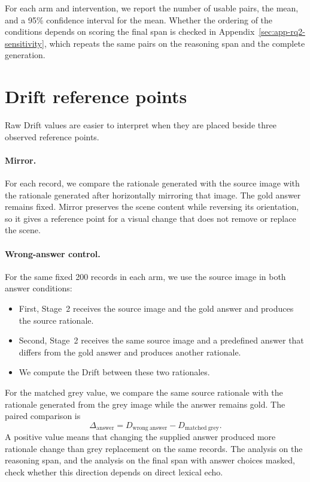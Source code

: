 For each arm and intervention, we report the number of usable pairs, the mean,
and a 95\% confidence interval for the mean. Whether the ordering of the
conditions depends on scoring the final span is checked in
Appendix~\ref{sec:app-rq2-sensitivity}, which repeats the same pairs on the
reasoning span and the complete generation.

\section{Drift reference points}
\label{sec:framework-anchors}

Raw Drift values are easier to interpret when they are placed beside three
observed reference points.

\paragraph{Mirror.}
For each record, we compare the rationale generated with the source image with
the rationale generated after horizontally mirroring that image. The gold answer
remains fixed. Mirror preserves the scene content while reversing its
orientation, so it gives a reference point for a visual change that does not
remove or replace the scene.

\paragraph{Wrong-answer control.}
For the same fixed 200 records in each arm, we use the source image in both
answer conditions:

\begin{itemize}
  \item First, Stage~2 receives the source image and the gold answer and
        produces the source rationale.
  \item Second, Stage~2 receives the same source image and a predefined answer
        that differs from the gold answer and produces another rationale.
  \item We compute the Drift between these two rationales.
\end{itemize}

For the matched grey value, we compare the same source rationale with the
rationale generated from the grey image while the answer remains gold. The
paired comparison is
\[
  \Delta_{\mathrm{answer}}
  =D_{\mathrm{wrong\ answer}}-D_{\mathrm{matched\ grey}}.
\]
A positive value means that changing the supplied answer produced more rationale
change than grey replacement on the same records. The analysis on the reasoning
span, and the analysis on the final span with answer choices masked, check
whether this direction depends on direct lexical echo.

